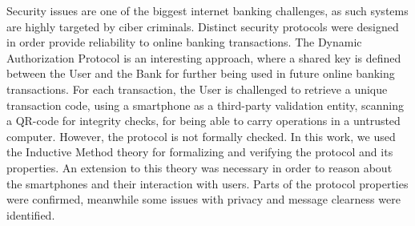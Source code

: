Security issues are one of the biggest internet banking challenges, as such systems are highly targeted by ciber criminals. Distinct security protocols were designed in order provide reliability to online banking transactions. The Dynamic Authorization Protocol is an interesting approach, where a shared key is defined between the User and the Bank for further being used in future online banking transactions. For each transaction, the User is challenged to retrieve a unique transaction code, using a smartphone as a third-party validation entity, scanning a QR-code for integrity checks, for being able to carry operations in a untrusted computer. However, the protocol is not formally checked. In this work, we used the Inductive Method theory for formalizing and verifying the protocol and its properties. An extension to this theory was necessary in order to reason about the smartphones and their interaction with users. Parts of the protocol properties were confirmed, meanwhile some issues with privacy and message clearness were identified.